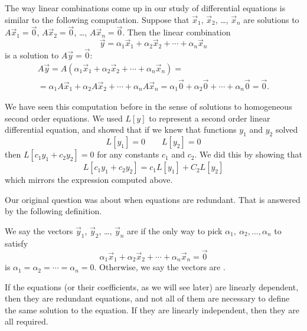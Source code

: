 \documentclass{ximera}
\begin{document}
The way linear combinations come up in our study of differential equations is similar to the following computation.  Suppose that $\vec{x}_1$, $\vec{x}_2$, \ldots, $\vec{x}_n$ are solutions to $A \vec{x}_1 = \vec{0}$,  $A \vec{x}_2 = \vec{0}$, \ldots, 
$A \vec{x}_n = \vec{0}$. Then the linear combination
\begin{equation*}
    \vec{y} = \alpha_1 \vec{x}_1 + \alpha_2 \vec{x}_2 + \cdots + \alpha_n \vec{x}_n 
\end{equation*}
is a solution to $A \vec{y} = \vec{0}$:
\begin{multline*}
    A \vec{y} = A (\alpha_1 \vec{x}_1 +  \alpha_2 \vec{x}_2 + \cdots + \alpha_n \vec{x}_n ) = \\
    = \alpha_1 A \vec{x}_1 + \alpha_2 A \vec{x}_2 + \cdots + \alpha_n A \vec{x}_n = \alpha_1 \vec{0} + 
    \alpha_2 \vec{0} + \cdots + \alpha_n \vec{0} = \vec{0} .
\end{multline*}

We have seen this computation before in the sense of solutions to homogeneous second order equations. We used $L[y]$ to represent a second order linear differential equation, and showed that if we knew that functions $y_1$ and $y_2$ solved 
\begin{equation*}
    L[y_1] = 0 \qquad L[y_2] = 0
\end{equation*}
then $L[c_1y_1 + c_2y_2] = 0$ for any constants $c_1$ and $c_2$. We did this by showing that
\begin{equation*}
    L[c_1y_1 + c_2y_2] = c_1L[y_1] + C_2L[y_2]
\end{equation*}
which mirrors the expression computed above.

Our original question was about when equations are redundant. That is answered by the following definition.

\begin{definition}
    We say the vectors $\vec{y}_1$, $\vec{y}_2$, \ldots, $\vec{y}_n$ are \emph{} if the only way to pick $\alpha_1,\ \alpha_2, ..., \alpha_n$ to satisfy
    \begin{equation*}
        \alpha_1 \vec{x}_1 + \alpha_2 \vec{x}_2 + \cdots + \alpha_n \vec{x}_n = \vec{0}
    \end{equation*}
    is $\alpha_1 = \alpha_2 = \cdots = \alpha_n = 0$. Otherwise, we say the vectors are \emph{}.
\end{definition}

If the equations (or their coefficients, as we will see later) are linearly dependent, then they are redundant equations, and not all of them are necessary to define the same solution to the equation. If they are linearly independent, then they are all required. 
\end{document}
